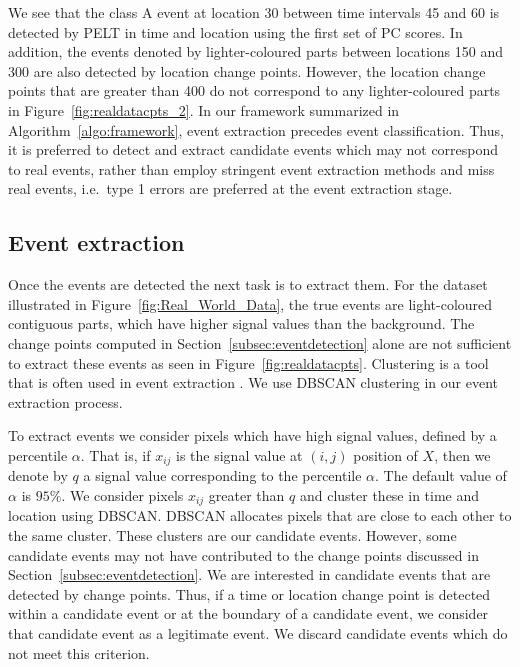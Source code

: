 \documentclass[a4paper,11pt]{article}
\begin{document}
We see that the class A event at location 30 between time intervals 45 and 60 is detected by PELT in time and location using the first set of PC scores. In addition, the events denoted by lighter-coloured parts between locations 150 and 300 are also detected by location change points. However, the location change points that are greater than 400 do not correspond to any lighter-coloured parts in Figure~\ref{fig:realdatacpts_2}. In our framework summarized in Algorithm~\ref{algo:framework}, event extraction precedes event classification. Thus, it is preferred to detect and extract candidate events which may not correspond to real events, rather than employ stringent event extraction methods and miss real events, i.e.\ type 1 errors are preferred at the event extraction stage.

\subsection{Event extraction}\label{subsec:eventextraction}

Once the events are detected the next task is to extract them. For the dataset illustrated in Figure~\ref{fig:Real_World_Data}, the true events are light-coloured contiguous parts, which have higher signal values than the background. The change points computed in Section~\ref{subsec:eventdetection} alone are not sufficient to extract these events as seen in Figure~\ref{fig:realdatacpts}. Clustering is a tool that is often used in event extraction \citep{ruocco2014scalable}. We use DBSCAN clustering in our event extraction process.

To extract events we consider pixels which have high signal values, defined by a percentile $\alpha$. That is, if $x_{ij}$ is the signal value at $(i, j)$ position of $X$, then we denote by $q$ a signal value corresponding to the percentile $\alpha$. The default value of $\alpha$ is $95\%$. We consider pixels $x_{ij}$ greater than $q$ and cluster these in time and location using DBSCAN\@. DBSCAN allocates pixels that are close to each other to the same cluster. These clusters are our candidate events. However, some candidate events may not have contributed to the change points discussed in Section~\ref{subsec:eventdetection}. We are interested in candidate events that are detected by change points. Thus, if a time or location change point is detected within a candidate event or at the boundary of a candidate event, we consider that candidate event as a legitimate event. We discard candidate events which do not meet this criterion.
\end{document}
